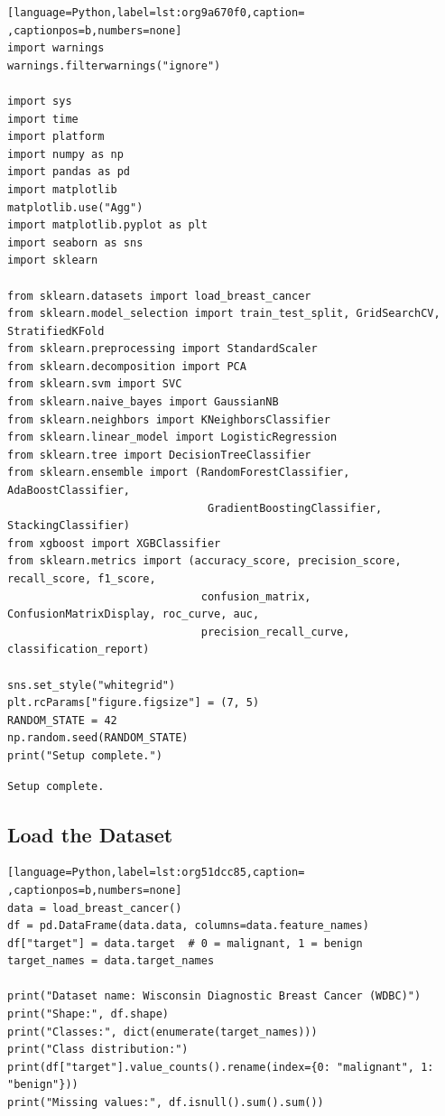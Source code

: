 \documentclass[12pt,a4paper]{article}
\begin{document}
\begin{lstlisting}[language=Python,label=lst:org9a670f0,caption= ,captionpos=b,numbers=none]
import warnings
warnings.filterwarnings("ignore")

import sys
import time
import platform
import numpy as np
import pandas as pd
import matplotlib
matplotlib.use("Agg")
import matplotlib.pyplot as plt
import seaborn as sns
import sklearn

from sklearn.datasets import load_breast_cancer
from sklearn.model_selection import train_test_split, GridSearchCV, StratifiedKFold
from sklearn.preprocessing import StandardScaler
from sklearn.decomposition import PCA
from sklearn.svm import SVC
from sklearn.naive_bayes import GaussianNB
from sklearn.neighbors import KNeighborsClassifier
from sklearn.linear_model import LogisticRegression
from sklearn.tree import DecisionTreeClassifier
from sklearn.ensemble import (RandomForestClassifier, AdaBoostClassifier,
                               GradientBoostingClassifier, StackingClassifier)
from xgboost import XGBClassifier
from sklearn.metrics import (accuracy_score, precision_score, recall_score, f1_score,
                              confusion_matrix, ConfusionMatrixDisplay, roc_curve, auc,
                              precision_recall_curve, classification_report)

sns.set_style("whitegrid")
plt.rcParams["figure.figsize"] = (7, 5)
RANDOM_STATE = 42
np.random.seed(RANDOM_STATE)
print("Setup complete.")
\end{lstlisting}

\begin{verbatim}
Setup complete.
\end{verbatim}

\subsection{Load the Dataset}
\label{sec:org762f2d5}

\begin{lstlisting}[language=Python,label=lst:org51dcc85,caption= ,captionpos=b,numbers=none]
data = load_breast_cancer()
df = pd.DataFrame(data.data, columns=data.feature_names)
df["target"] = data.target  # 0 = malignant, 1 = benign
target_names = data.target_names

print("Dataset name: Wisconsin Diagnostic Breast Cancer (WDBC)")
print("Shape:", df.shape)
print("Classes:", dict(enumerate(target_names)))
print("Class distribution:")
print(df["target"].value_counts().rename(index={0: "malignant", 1: "benign"}))
print("Missing values:", df.isnull().sum().sum())
\end{lstlisting}
\end{document}
